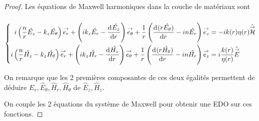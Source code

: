   \begin{proof}

    Les équations de Maxwell harmoniques dans la couche de matériaux sont

    \begin{equation*}
    \end{equation*}
    \begin{equation*}
    \left\lbrace \begin{aligned}
      i\left(\frac{n}{r}\hat{E_z} - k_z\hat{E_\theta}\right)\vect{e_r} +
      \left(ik_z\hat{E_r} - \ddp{r}{\hat{E_z}}\right)\vect{e_\theta} +
      \frac{1}{r}\left(\ddp{r}{(r\hat{E_\theta})}-in\hat{E_r}\right)\vect{e_z}
      &=-ik(r)\eta(r) \hat \vH
      \\
      i\left(\frac{n}{r}\hat{H_z} - k_z\hat{H_\theta}\right)\vect{e_r} +
      \left(ik_z\hat{H_r} - \ddp{r}{\hat{H_z}}\right)\vect{e_\theta} +
      \frac{1}{r}\left(\ddp{r}{(r\hat{H_\theta})}-in\hat{H_r}\right)\vect{e_z}
      &=i\frac{k(r)}{\eta(r)} \hat \vE
    \end{aligned}\right.
    \end{equation*}    %

    On remarque que les 2 premières composantes de ces deux égalités permettent de déduire \(\hat E_r,\hat E_\theta, \hat H_r,\hat H_\theta\) de \(\hat E_z,\hat H_z\).

    On couple les 2 équations du système de Maxwell pour obtenir une EDO sur ces fonctions.



\end{proof}
